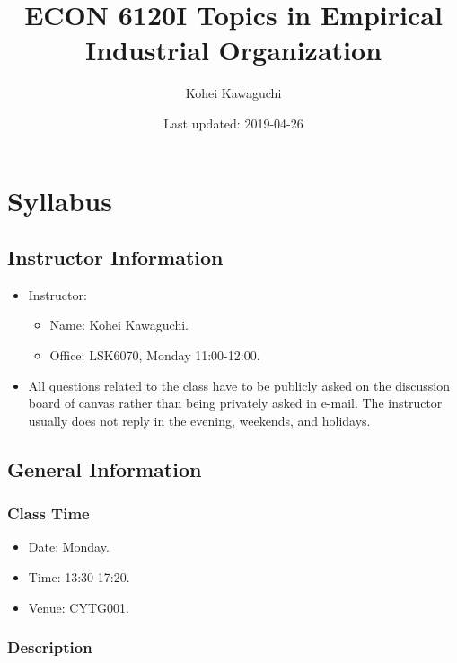 \documentclass[]{book}
\title{ECON 6120I Topics in Empirical Industrial Organization}
\author{Kohei Kawaguchi}
\date{Last updated: 2019-04-26}
\providecommand{\tightlist}{%
  \setlength{\itemsep}{0pt}\setlength{\parskip}{0pt}}
\begin{document}
\maketitle

{
\setcounter{tocdepth}{1}
\tableofcontents
}
\chapter{Syllabus}\label{syllabus}

\section{Instructor Information}\label{instructor-information}

\begin{itemize}
\tightlist
\item
  Instructor:

  \begin{itemize}
  \tightlist
  \item
    Name: Kohei Kawaguchi.
  \item
    Office: LSK6070, Monday 11:00-12:00.
  \end{itemize}
\item
  All questions related to the class have to be publicly asked on the
  discussion board of canvas rather than being privately asked in
  e-mail. The instructor usually does not reply in the evening,
  weekends, and holidays.
\end{itemize}

\section{General Information}\label{general-information}

\subsection{Class Time}\label{class-time}

\begin{itemize}
\tightlist
\item
  Date: Monday.
\item
  Time: 13:30-17:20.
\item
  Venue: CYTG001.
\end{itemize}

\subsection{Description}\label{description}
\end{document}
